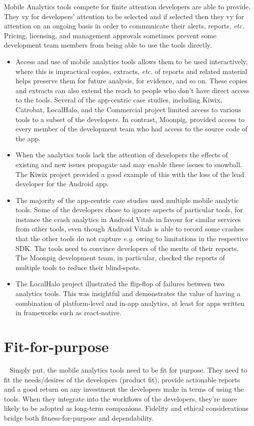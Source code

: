 Mobile Analytics tools compete for finite attention developers are able to provide. They vy for developers' attention to be selected and if selected then they vy for attention on an ongoing basis in order to communicate their alerts, reports, \emph{etc.} Pricing, licensing, and management approvals sometimes prevent some development team members from being able to use the tools directly.

\begin{itemize}
    \itemsep0em
    \item Access and use of mobile analytics tools allows them to be used interactively, where this is impractical copies, extracts, \emph{etc.} of reports and related material helps  preserve them for future analysis, for evidence, and so on. These copies and extracts can also extend the reach to people who don't have direct access to the tools. Several of the app-centric case studies, including Kiwix, Catrobat, LocalHalo, and the Commercial project limited access to various tools to a subset of the developers. In contrast, Moonpig, provided access to every member of the development team who had access to the source code of the app.
    \item When the analytics tools lack the attention of developers the effects of existing and new issues propagate and may enable these issues to snowball. The Kiwix project provided a good example of this with the loss of the lead developer for the Android app.
    \item The majority of the app-centric case studies used multiple mobile analytic tools. Some of the developers chose to ignore aspects of particular tools, for instance the crash analytics in Android Vitals in favour for similar services from other tools, even though Android Vitals is able to record some crashes that the other tools do not capture \emph{e.g.} owing to limitations in the respective SDK. The tools need to convince developers of the merits of their reports. The Moonpig development team, in particular, checked the reports of multiple tools to reduce their blind-spots.
    \item The LocalHalo project illustrated the flip-flop of failures between two analytics tools. This was insightful and demonstrates the value of having a combination of platform-level and in-app analytics, at least for apps written in frameworks such as react-native.
\end{itemize}


\section{Fit-for-purpose}~\label{section-fit-for-purpose}
Simply put, the mobile analytics tools need to be fit for purpose. They need to fit the needs/desires of the developers (product fit), provide actionable reports and a good return on any investment the developers make in terms of using the tools. When they integrate into the workflows of the developers, they're more likely to be adopted as long-term companions. Fidelity and ethical considerations bridge both fitness-for-purpose and dependability.

